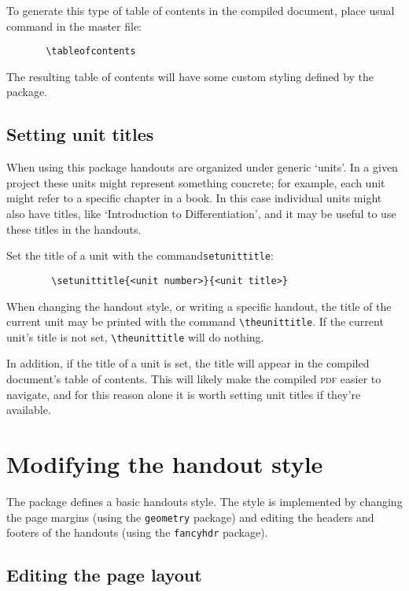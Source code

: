 \documentclass[10pt,oneside,letterpaper]{article}
\newcommand{\indexcommand}[1]{
	\index{\texttt{#1}}%
	\marginpar{\texttt{\textbackslash#1}}%
}
\newcommand{\pdf}{\textsc{pdf} }
\begin{document}
To generate this type of table of contents in the compiled document, place usual command in the master file:
\begin{verbatim}
	   \tableofcontents
\end{verbatim}
The resulting table of contents will have some custom styling defined by the package.



\subsection{Setting unit titles}

When
using this package handouts are organized under generic `units'.
In a given project these units might represent something concrete;
	for example, each unit might refer to a specific chapter in a book.
In this case individual units might also have titles, like 
	`Introduction to Differentiation',
	and it may be useful to use these titles in the handouts.

\indexcommand{setunittitle}
Set the title of a unit with the command\texttt{setunittitle}:
\begin{verbatim}
	    \setunittitle{<unit number>}{<unit title>}
\end{verbatim}

When changing the handout style, or writing a specific handout, the title of the current unit may be printed with the command \verb$\theunittitle$.
If the current unit's title is not set, \verb$\theunittitle$ will do nothing.

In addition, if the title of a unit is set, the title will appear in the compiled document's table of contents.
This will likely make the compiled \pdf easier to navigate, and for this reason alone it is worth setting unit titles if they're available.



\section{Modifying the handout style}




The package defines a basic handouts style.
The style is implemented by changing the page margins (using the \texttt{geometry} package)
	and editing the headers and footers of the handouts (using the \texttt{fancyhdr} package).


\subsection{Editing the page layout}
\end{document}
